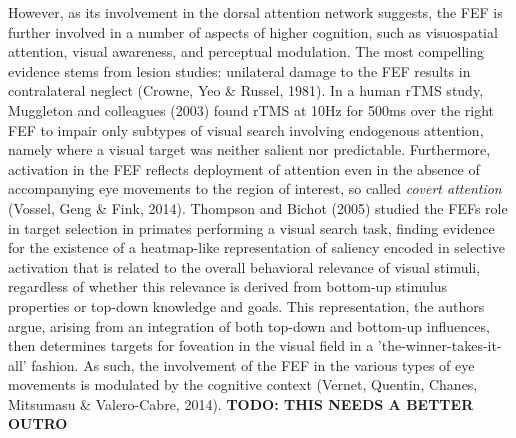 \documentclass[a4paper, 12pt]{scrreprt}
\begin{document}
However, as its involvement in the dorsal attention network suggests, the FEF is further involved in a number of aspects of higher cognition, such as visuospatial attention, visual awareness, and perceptual modulation. The most compelling evidence stems from lesion studies: unilateral damage to the FEF results in contralateral neglect (Crowne, Yeo \& Russel, 1981). In a human rTMS study, Muggleton and colleagues (2003) found rTMS at 10Hz for 500ms over the right FEF to impair only subtypes of visual search involving endogenous attention, namely where a visual target was neither salient nor predictable. Furthermore, activation in the FEF reflects deployment of attention even in the absence of accompanying eye movements to the region of interest, so called \textit{covert attention} (Vossel, Geng \& Fink, 2014). Thompson and Bichot (2005) studied the FEFs role in target selection in primates performing a visual search task, finding evidence for the existence of a heatmap-like representation of saliency encoded in selective activation that is related to the overall behavioral relevance of visual stimuli, regardless of whether this relevance is derived from bottom-up stimulus properties or top-down knowledge and goals. This representation, the authors argue, arising from an integration of both top-down and bottom-up influences, then determines targets for foveation in the visual field in a 'the-winner-takes-it-all' fashion. 
As such, the involvement of the FEF in the various types of eye movements is modulated by the cognitive context (Vernet, Quentin, Chanes, Mitsumasu \& Valero-Cabre, 2014). \newline
\textbf{TODO: THIS NEEDS A BETTER OUTRO}
\end{document}
